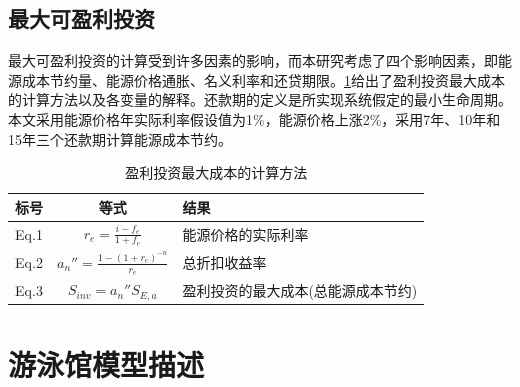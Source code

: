 \documentclass[hyperref]{ctexart}
\begin{document}
\begin{multicols}{2}
		\subsection{最大可盈利投资}
		最大可盈利投资的计算受到许多因素的影响，而本研究考虑了四个影响因素，即能源成本节约量、能源价格通胀、名义利率和还贷期限。\cref{tab2}给出了盈利投资最大成本的计算方法以及各变量的解释。还款期的定义是所实现系统假定的最小生命周期。本文采用能源价格年实际利率假设值为1\%，能源价格上涨2\%，采用7年、10年和15年三个还款期计算能源成本节约。
		\par
		\begin{table}[H]
			\centering
			\caption{盈利投资最大成本的计算方法}
			\begin{tabular}{ccp{10em}}
				\toprule    
				标号 & 等式 & 结果\\
				\midrule
				Eq.1 & $r_{e}=\frac{i-f_{e}}{1+f_{e}}$ & 能源价格的实际利率 \\
				Eq.2 & $a_{n}''=\frac{1-(1+r_{e})^{-n}}{r_{e}}$ & 总折扣收益率 \\
				Eq.3 & $S_{inv}=a_{n}''S_{E,a}$ & 盈利投资的最大成本(总能源成本节约)\\
				\bottomrule  
			\end{tabular}
			\label{tab2}
		\end{table}
		\section{游泳馆模型描述}

\end{multicols}
\end{document}
